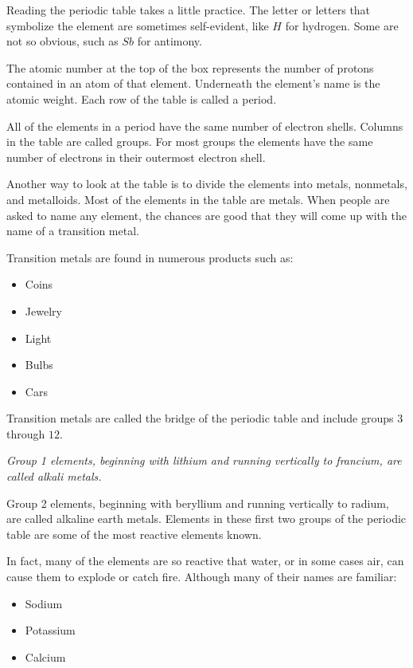Reading the periodic table takes a little practice. The letter or letters that
symbolize the element are sometimes self-evident, like $H$ for hydrogen. Some are
not so obvious, such as $Sb$ for antimony.

The atomic number at the top of the box represents the number of protons
contained in an atom of that element. Underneath the element's name is the
atomic weight. Each row of the table is called a period.

All of the elements in a period have the same number of electron shells. Columns
in the table are called groups. For most groups the elements have the same
number of electrons in their outermost electron shell.

Another way to look at the table is to divide the elements into metals,
nonmetals, and metalloids. Most of the elements in the table are metals. When
people are asked to name any element, the chances are good that they will come
up with the name of a transition metal.

Transition metals are found in numerous products such as:

\begin{itemize}
    \item Coins
    \item Jewelry
    \item Light
    \item Bulbs
    \item Cars
\end{itemize}

Transition metals are called the bridge of the periodic table and include groups
$3$ through $12$.

\it{Group 1 elements}, beginning with \it{lithium} and running
vertically to \it{francium}, are called \it{alkali metals}.

Group 2 elements, beginning with beryllium and running vertically to radium, are
called alkaline earth metals. Elements in these first two groups of the periodic
table are some of the most reactive elements known.

In fact, many of the elements are so reactive that water, or in some cases air,
can cause them to explode or catch fire. Although many of their names are
familiar:

\begin{itemize}
    \item Sodium
    \item Potassium
    \item Calcium
\end{itemize}

